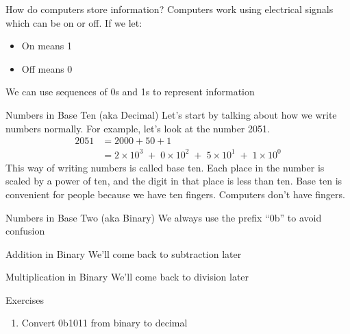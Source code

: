 

\begin{frame}{How do computers store information?}
Computers work using electrical signals which can be on or off. If we let:
\begin{itemize}
    \item On means 1
    \item Off means 0
\end{itemize}
We can use sequences of 0s and 1s to represent information
\end{frame}


\begin{frame}{Numbers in Base Ten (aka Decimal)}
Let's start by talking about how we write numbers normally. For example, let's look at the number 2051. 
\begin{align*}
2051 &= 2000 + 50 + 1 \\
&= 2 \times 10^3 \;+\; 0 \times 10^2 \;+\; 5 \times 10^1 \;+\; 1 \times 10^0
\end{align*}
This way of writing numbers is called base ten. Each place in the number is scaled by a power of ten, and the digit in that place is less than ten. 
Base ten is convenient for people because we have ten fingers. 
Computers don't have fingers.
\end{frame}
    
\begin{frame}{Numbers in Base Two (aka Binary)}
We always use the prefix ``0b'' to avoid confusion
\end{frame}

\begin{frame}{Addition in Binary}
We'll come back to subtraction later
\end{frame}
    
\begin{frame}{Multiplication in Binary}
We'll come back to division later
\end{frame}


\begin{frame}{Exercises}
\begin{enumerate}
    \item Convert 0b1011 from binary to decimal
\end{enumerate}
\end{frame}




